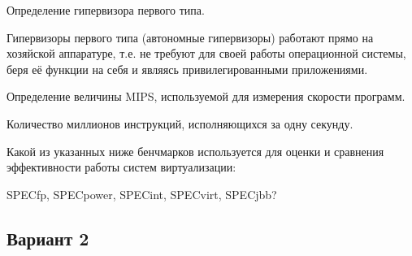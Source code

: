 \begin{questions}
\question[3] Определение гипервизора первого типа.
\begin{solution}[2cm]
Гипервизоры первого типа (автономные гипервизоры) работают прямо на хозяйской аппаратуре, т.е. не требуют для своей работы операционной системы, беря её функции на себя и являясь привилегированными приложениями.
\end{solution}

\question[3] Определение величины MIPS, используемой для измерения скорости программ.
\begin{solution}[1cm]
Количество миллионов инструкций, исполняющихся за одну секунду.
\end{solution}
    
\question[3] Какой из указанных ниже бенчмарков используется для оценки и сравнения эффективности работы систем виртуализации:
\begin{choices}
\choice SPECfp,
\choice SPECpower,
\choice SPECint,
\correctchoice SPECvirt,
\choice SPECjbb?
\end{choices}


\end{questions}
\subsection*{Вариант 2}

